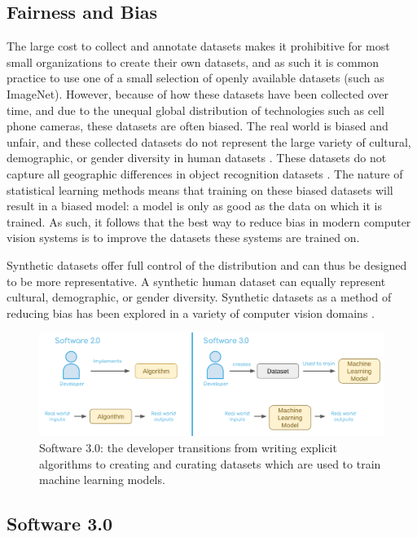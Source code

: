 \documentclass{article}
\begin{document}
\subsection{Fairness and Bias}

The large cost to collect and annotate datasets makes it prohibitive for most small organizations to create their own datasets, and as such it is common practice to use one of a small selection of openly available datasets (such as ImageNet). However, because of how these datasets have been collected over time, and due to the unequal global distribution of technologies such as cell phone cameras, these datasets are often biased. The real world is biased and unfair, and these collected datasets do not represent the large variety of cultural, demographic, or gender diversity  in human datasets \cite{shankar2017classification}. These datasets do not capture all geographic differences in object recognition datasets \cite{DBLP:journals/corr/abs-1906-02659}. The nature of statistical learning methods means that training on these biased datasets will result in a biased model: a model is only as good as the data on which it is trained. As such, it follows that the best way to reduce bias in modern computer vision systems is to improve the datasets these systems are trained on.

Synthetic datasets offer full control of the distribution and can thus be designed to be more representative. A synthetic human dataset can equally represent cultural, demographic, or gender diversity. Synthetic datasets as a method of reducing bias has been explored in a variety of computer vision domains \cite{DBLP:journals/corr/abs-2004-13866}.

\begin{figure}
	\centering
	\includegraphics[width=\textwidth]{software3.png}
	\caption{Software 3.0: the developer transitions from writing explicit algorithms to creating and curating datasets which are used to train machine learning models.}
	\label{fig:fig2}
\end{figure}

\subsection{Software 3.0}
\label{sec:software3.0}
\end{document}
